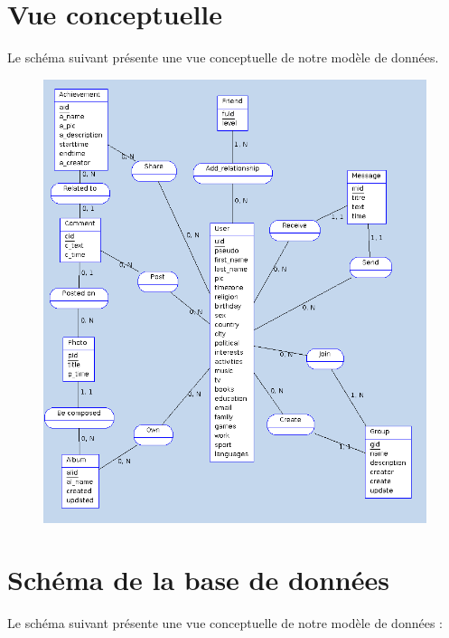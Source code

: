 \documentclass{life-fr}
\begin{document}
\newpage

\section{Vue conceptuelle}

Le schéma suivant présente une vue conceptuelle de notre modèle de données.

\begin{figure}[H]
  \begin{center}
    \includegraphics[width=16cm]{img/vue_donnees.png}
  \end{center}
\end{figure}

\newpage

\section{Schéma de la base de données}

Le schéma suivant présente une vue conceptuelle de notre modèle de données :
\end{document}
